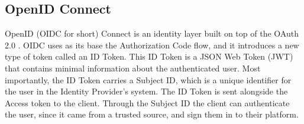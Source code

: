 


\subsection{OpenID Connect}
\label{cha:relatedwork:oauth:openid}


OpenID (OIDC for short) Connect is an identity layer built on top of the OAuth 2.0
\cite{OpenIDConnectCore}.
%
OIDC uses as its base the Authorization Code flow, 
and it introduces a new type of token called an ID Token.
This ID Token is a JSON Web Token (JWT) that contains minimal information about the authenticated
user.
Most importantly, the ID Token carries a Subject ID, which is a unique identifier
for the user in the Identity Provider's system.
The ID Token is sent alongside the Access token to the client.
Through the Subject ID the client can authenticate the user, since it came from a trusted
source, and sign them in to their platform.



